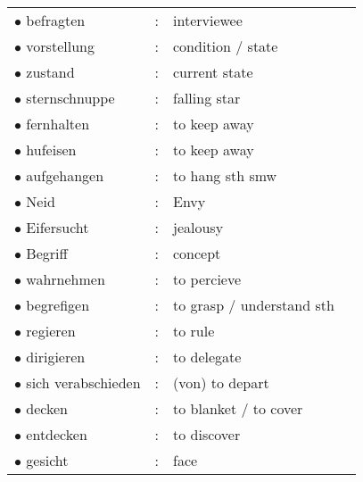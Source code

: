 \documentclass[a4paper,twocolumn,10pt]{article}
\begin{document}
\begin{tabularx}{0.95\linewidth}{lll|X}
\rowcolor{white} $\bullet$ befragten             & : & interviewee                                  & \\
\rowcolor{white} $\bullet$ vorstellung           & : & condition / state                            & \\
\rowcolor{white} $\bullet$ zustand               & : & current state                                & \\
\rowcolor{white} $\bullet$ sternschnuppe         & : & falling star                                 & \\
\rowcolor{white} $\bullet$ fernhalten            & : & to keep away                                 & \\
\rowcolor{white} $\bullet$ hufeisen              & : & to keep away                                 & \\
\rowcolor{white} $\bullet$ aufgehangen           & : & to hang sth smw                              & \\
\rowcolor{white} $\bullet$ Neid                  & : & Envy                                         & \\
\rowcolor{white} $\bullet$ Eifersucht            & : & jealousy                                     & \\
\rowcolor{white} $\bullet$ Begriff               & : & concept                                      & \\
\rowcolor{white} $\bullet$ wahrnehmen            & : & to percieve                                  & \\
\rowcolor{white} $\bullet$ begrefigen            & : & to grasp / understand sth                    & \\
\rowcolor{white} $\bullet$ regieren              & : & to rule                                      & \\
\rowcolor{white} $\bullet$ dirigieren            & : & to delegate                                  & \\
\rowcolor{white} $\bullet$ sich verabschieden    & : & (von) to depart                              & \\
\rowcolor{white} $\bullet$ decken                & : & to blanket / to cover                        & \\
\rowcolor{white} $\bullet$ entdecken             & : & to discover                                  & \\
\rowcolor{white} $\bullet$ gesicht               & : & face                                         & \\

\end{tabularx}
\end{document}
